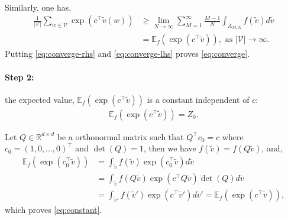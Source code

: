 \documentclass{article} \usepackage{acl2017,times}
\newenvironment{proof}[1][Proof]{\begin{trivlist}
\item[\hskip \labelsep {\bfseries #1}]}{\end{trivlist}}
\begin{document}
\begin{proof}
\begin{align}
    \end{align}
    Similarly, one has,
    \begin{align}
        \frac{1}{|\mathcal{V}|}\sum_{w\in \mathcal{V}} \exp\left(c^{\top} \tilde{v}(w)\right) &\ge \lim_{N\to\infty} \sum_{M=1}^{\infty} \frac{M-1}{N} \int_{A_{M,N}} f(\tilde{v})d\tilde{v} \nonumber \\
        &= \mathbb{E}_{f} \left(\exp\left(c^{\top} \tilde{v} \right)\right), \textrm{ as }|\mathcal{V}| \to \infty. \label{eq:converge-lhs}
    \end{align}
    Putting \eqref{eq:converge-rhs} and \eqref{eq:converge-lhs} proves \eqref{eq:converge}.
\end{proof}
\paragraph{Step 2:} the expected value, $\mathbb{E}_{f} \left(\exp\left(c^{\top} \tilde{v} \right)\right)$ is a constant independent of $c$:  
\begin{align}
    \mathbb{E}_{f} \left(\exp\left(c^{\top} \tilde{v} \right)\right) = Z_0. \label{eq:constant}
\end{align}
\begin{proof}
    Let $Q\in \mathbb{R}^{d\times d}$ be a orthonormal matrix such that $Q^{\top}c_0 = c$ where $c_0 = (1,0,...,0)^{\top}$ and $\det(Q) = 1$, then we have $f(\tilde{v}) = f(Q\tilde{v})$, and,
    \begin{align*}
        \mathbb{E}_{f} \left(\exp\left(c_0^{\top} \tilde{v} \right)\right) &= \int_{\tilde{v}} f(\tilde{v}) \exp\left(c_0^{\top} \tilde{v} \right) d\tilde{v} \\
        &= \int_{\tilde{v}} f(Q\tilde{v}) \exp\left(c^{\top} Q\tilde{v} \right) \det(Q) d\tilde{v} \\
        &= \int_{\tilde{v}'} f(\tilde{v}') \exp\left(c^{\top}\tilde{v}' \right) d\tilde{v}' = \mathbb{E}_{f} \left(\exp\left(c^{\top} \tilde{v} \right)\right),
    \end{align*}
    which proves \eqref{eq:constant}.
\end{proof}
\end{document}
